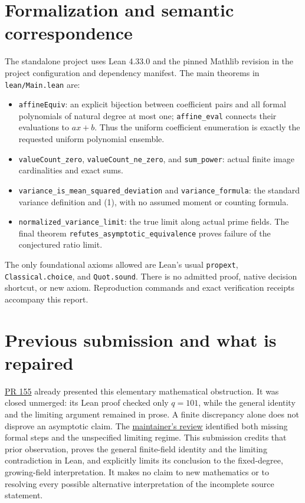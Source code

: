 \documentclass[11pt]{article}
\begin{document}
\section{Formalization and semantic correspondence}
The standalone project uses Lean 4.33.0 and the pinned Mathlib revision in the project configuration and dependency manifest.
The main theorems in \texttt{lean/Main.lean} are:
\begin{itemize}
\item \texttt{affineEquiv}: an explicit bijection between coefficient pairs
and all formal polynomials of natural degree at most one;
\texttt{affine\_eval} connects their evaluations to $ax+b$.
Thus the uniform coefficient enumeration is exactly the requested uniform
polynomial ensemble.
\item \texttt{valueCount\_zero}, \texttt{valueCount\_ne\_zero}, and
\texttt{sum\_power}: actual finite image cardinalities and exact sums.
\item \texttt{variance\_is\_mean\_squared\_deviation} and
\texttt{variance\_formula}: the standard variance definition and (1), with
no assumed moment or counting formula.
\item \texttt{normalized\_variance\_limit}: the true limit along actual
prime fields. The final theorem
\texttt{refutes\_asymptotic\_equivalence} proves failure of the
conjectured ratio limit.
\end{itemize}
The only foundational axioms allowed are Lean's usual
\texttt{propext}, \texttt{Classical.choice}, and \texttt{Quot.sound}.
There is no admitted proof, native decision shortcut, or new axiom.
Reproduction commands and exact verification receipts accompany this report.

\section{Previous submission and what is repaired}
\href{https://github.com/The-Last-Math-Competition/The-Last-Math-Competition/pull/155}{PR 155}
already presented this elementary mathematical obstruction. It was closed
unmerged: its Lean proof checked only $q=101$, while the general identity
and the limiting argument remained in prose. A finite discrepancy alone
does not disprove an asymptotic claim. The
\href{https://github.com/The-Last-Math-Competition/The-Last-Math-Competition/pull/155\#issuecomment-5951812972}{maintainer's review}
identified both missing formal steps and the unspecified limiting regime.
This submission credits that prior observation, proves the general
finite-field identity and the limiting contradiction in Lean, and explicitly
limits its conclusion to the fixed-degree, growing-field interpretation.
It makes no claim to new mathematics or to resolving every possible
alternative interpretation of the incomplete source statement.
\end{document}
